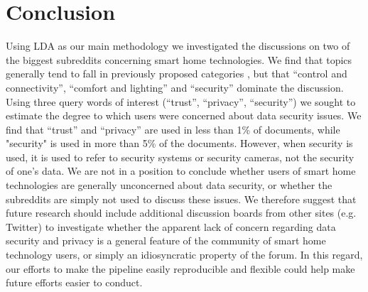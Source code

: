 \documentclass{article}
\begin{document}
    \section{Conclusion}
    Using LDA as our main methodology we investigated the discussions on two of the biggest subreddits concerning smart home technologies. We find that topics generally tend to fall in previously proposed categories \cite{hubert2020take}, but that “control and connectivity”, “comfort and lighting” and “security” dominate the discussion. Using three query words of interest (“trust”, “privacy”, “security”) we sought to estimate the degree to which users were concerned about data security issues. We find that “trust” and “privacy” are used in less than 1\% of documents, while "security" is used in more than 5\% of the documents. However, when security is used, it is used to refer to security systems or security cameras, not the security of one’s data. We are not in a position to conclude whether users of smart home technologies are generally unconcerned about data security, or whether the subreddits are simply not used to discuss these issues. We therefore suggest that future research should include additional discussion boards from other sites (e.g. Twitter) to investigate whether the apparent lack of concern regarding data security and privacy is a general feature of the community of smart home technology users, or simply an idiosyncratic property of the forum. In this regard, our efforts to make the pipeline easily reproducible and flexible could help make future efforts easier to conduct. 
\end{document}
